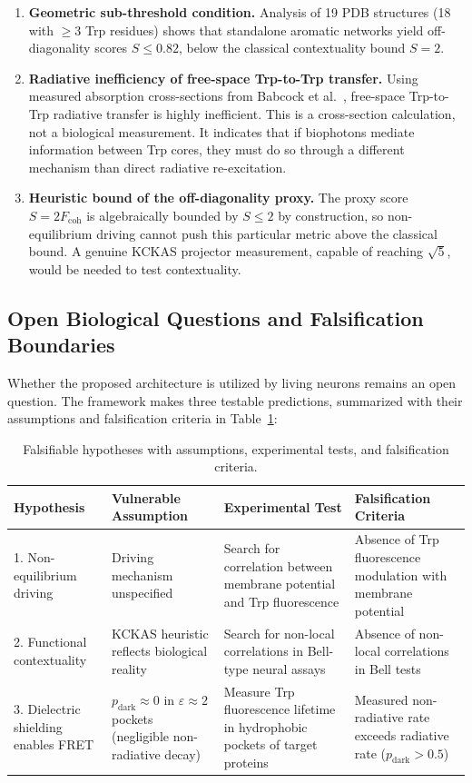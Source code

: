 \documentclass[aps,pre,twocolumn,showpacs,superscriptaddress]{revtex4-2}
\begin{document}
\begin{enumerate}
\item \textbf{Geometric sub-threshold condition.} Analysis of 19 PDB structures (18 with $\geq 3$ Trp residues) shows that standalone aromatic networks yield off-diagonality scores $S \leq 0.82$, below the classical contextuality bound $S = 2$.

\item \textbf{Radiative inefficiency of free-space Trp-to-Trp transfer.} Using measured absorption cross-sections from Babcock et al.~\cite{Babcock2024}, free-space Trp-to-Trp radiative transfer is highly inefficient. This is a cross-section calculation, not a biological measurement. It indicates that if biophotons mediate information between Trp cores, they must do so through a different mechanism than direct radiative re-excitation.

\item \textbf{Heuristic bound of the off-diagonality proxy.} The proxy score $S = 2F_{\mathrm{coh}}$ is algebraically bounded by $S \leq 2$ by construction, so non-equilibrium driving cannot push this particular metric above the classical bound. A genuine KCKAS projector measurement, capable of reaching $\sqrt{5}$, would be needed to test contextuality.
\end{enumerate}

\subsection{Open Biological Questions and Falsification Boundaries}

Whether the proposed architecture is utilized by living neurons remains an open question. The framework makes three testable predictions, summarized with their assumptions and falsification criteria in Table~\ref{tab:falsification}:

\begin{table}[htbp]
\caption{Falsifiable hypotheses with assumptions, experimental tests, and falsification criteria.}
\label{tab:falsification}
\centering
\begin{tabular}{lp{2.8cm}p{2.8cm}p{2.8cm}}
\toprule
Hypothesis & Vulnerable Assumption & Experimental Test & Falsification Criteria \\
\midrule
1. Non-equilibrium driving & Driving mechanism unspecified & Search for correlation between membrane potential and Trp fluorescence & Absence of Trp fluorescence modulation with membrane potential \\
2. Functional contextuality & KCKAS heuristic reflects biological reality & Search for non-local correlations in Bell-type neural assays & Absence of non-local correlations in Bell tests \\
3. Dielectric shielding enables FRET & $p_{\mathrm{dark}} \approx 0$ in $\varepsilon \approx 2$ pockets (negligible non-radiative decay) & Measure Trp fluorescence lifetime in hydrophobic pockets of target proteins & Measured non-radiative rate exceeds radiative rate ($p_{\mathrm{dark}} > 0.5$) \\
\bottomrule
\end{tabular}
\end{table}
\end{document}
